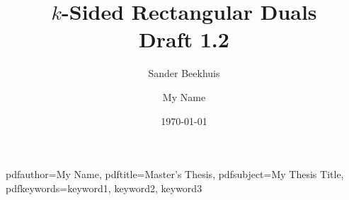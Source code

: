 




%


\title{$k$-Sided Rectangular Duals \\ \normalsize Draft 1.2}
\author{Sander Beekhuis}
\date{\today} %


%
%
\newcommand{\shortdoctitle}{Master's Thesis}
\newcommand{\doctitle}{My Thesis Title}
\newcommand{\docsubtitle}{Master Thesis}

\newcommand{\me}{My Name}
\newcommand{\keywords}{keyword1, keyword2, keyword3}
\newcommand{\version}{EMPTY version}
\newcommand{\monthYear}{Month 201X}

\newcommand{\firstCommitteeMember}{Your First Committee Member}
\newcommand{\secondCommitteeMember}{Your second Committee Member, usually the daily supervisor}
\newcommand{\thirdCommitteeMember}{Your Third Committee Member, usually the external member}

\author{\me}

%
%
\hypersetup
{
    pdfauthor={\me},
    pdftitle={\shortdoctitle},
    pdfsubject={\doctitle},
    pdfkeywords={\keywords}
}







\normalsize

\clearemptydoublepage





